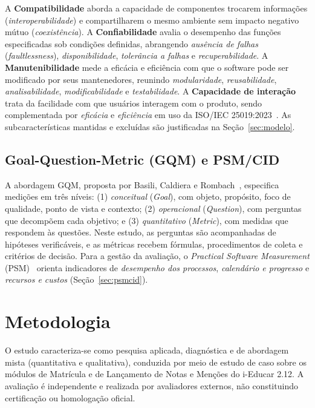 \documentclass[conference]{model/IEEEtran}%
\begin{document}
A \textbf{Compatibilidade} aborda a capacidade de componentes trocarem informações (\textit{interoperabilidade}) e compartilharem o mesmo ambiente sem impacto negativo mútuo (\textit{coexistência}). A \textbf{Confiabilidade} avalia o desempenho das funções especificadas sob condições definidas, abrangendo \textit{ausência de falhas} (\textit{faultlessness}), \textit{disponibilidade}, \textit{tolerância a falhas} e \textit{recuperabilidade}. A \textbf{Manutenibilidade} mede a eficácia e eficiência com que o software pode ser modificado por seus mantenedores, reunindo \textit{modularidade}, \textit{reusabilidade}, \textit{analisabilidade}, \textit{modificabilidade} e \textit{testabilidade}. A \textbf{Capacidade de interação} trata da facilidade com que usuários interagem com o produto, sendo complementada por \textit{eficácia} e \textit{eficiência} em uso da ISO/IEC 25019:2023~\cite{iso25019}. As subcaracterísticas mantidas e excluídas são justificadas na Seção~\ref{sec:modelo}.

\subsection{Goal-Question-Metric (GQM) e PSM/CID}
A abordagem GQM, proposta por Basili, Caldiera e Rombach~\cite{basili1994gqm}, especifica medições em três níveis: (1) \textit{conceitual} (\textit{Goal}), com objeto, propósito, foco de qualidade, ponto de vista e contexto; (2) \textit{operacional} (\textit{Question}), com perguntas que decompõem cada objetivo; e (3) \textit{quantitativo} (\textit{Metric}), com medidas que respondem às questões. Neste estudo, as perguntas são acompanhadas de hipóteses verificáveis, e as métricas recebem fórmulas, procedimentos de coleta e critérios de decisão. Para a gestão da avaliação, o \textit{Practical Software Measurement} (PSM)~\cite{mcgarry2002psm} orienta indicadores de \textit{desempenho dos processos}, \textit{calendário e progresso} e \textit{recursos e custos} (Seção~\ref{sec:psmcid}).

\section{Metodologia}\label{sec:met}

O estudo caracteriza-se como pesquisa aplicada, diagnóstica e de abordagem mista (quantitativa e qualitativa), conduzida por meio de estudo de caso sobre os módulos de Matrícula e de Lançamento de Notas e Menções do i-Educar 2.12. A avaliação é independente e realizada por avaliadores externos, não constituindo certificação ou homologação oficial.
\end{document}

